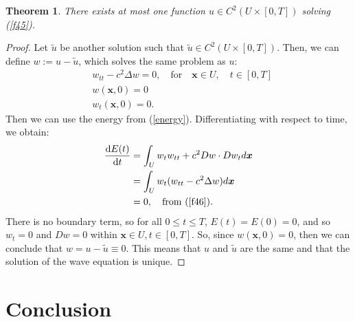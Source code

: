 \documentclass[a4paper, 12pt]{article}
\numberwithin{equation}{section}
\begin{document}
\newtheorem*{theorem}{Theorem}
\begin{theorem}
    There exists at most one function $u \in C^2(U \times [0,T])$ solving
    (\ref{f45}).
\end{theorem}

\begin{proof}
    Let $\tilde{u}$ be another solution such that $\tilde{u} \in C^2(U \times
    [0,T])$. Then, we can define $w:=u-\tilde{u}$, which solves the same problem
    as $u$:
    \begin{equation} \label{f46}
        \begin{aligned}
            &w_{tt}-c^2\Delta w =0, \quad \textrm{for} \quad \boldsymbol{x} \in U, \quad t \in [0,T]\\
            &w(\boldsymbol{x}, 0)=0\\
            &w_t(\boldsymbol{x}, 0)=0.
        \end{aligned}
    \end{equation}
    Then we can use the energy from (\ref{energy}). Differentiating with respect
    to time, we obtain:
    \begin{equation*}
        \begin{aligned}
            \diff{E(t)}{t}&=\int_U w_t w_{tt} + c^2 Dw \cdot Dw_t d\boldsymbol{x}\\
            &=\int_U w_t (w_{tt}-c^2 \Delta w)d\boldsymbol{x}\\
            &=0, \quad \textrm{from (\ref{f46})}.
        \end{aligned}
    \end{equation*}
    There is no boundary term, so for all $0 \le t \le T$, $E(t)=E(0)=0$, and so
    $w_t=0$ and $Dw=0$ within $\boldsymbol{x} \in U, t \in [0,T]$. So, since
    $w(\boldsymbol{x}, 0)=0$, then we can conclude that $w=u-\tilde{u}\equiv 0$.
    This means that $u$ and $\tilde{u}$ are the same and that the solution of
    the wave equation is unique.
\renewcommand\qedsymbol{q.e.d.}
\end{proof}

\section{Conclusion}

\newpage 



\end{document}
